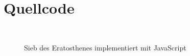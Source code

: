 \chapter{Quellcode}

\begin{figure}[H]
  \begin{codebox}[]
    \begin{verbatim}
      
    \end{verbatim}
  \end{codebox}
  \caption[\enquote{Sieb des Eratosthenes implementiert mit JavaScript} visualisiert mit Minted]{Sieb des Eratosthenes implementiert mit JavaScript}
  \label{fig:sieve-of-eratosthenes}
\end{figure}
